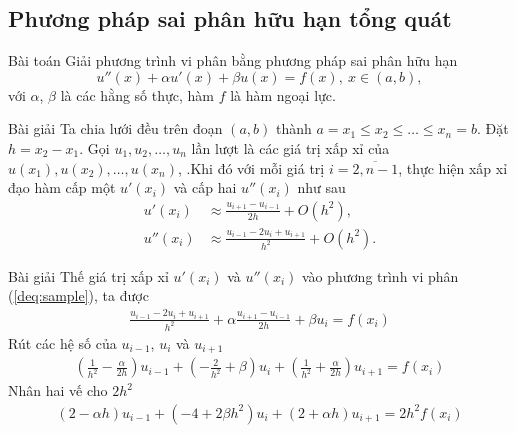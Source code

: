 \documentclass[9pt]{beamer}
\numberwithin{equation}{section}
\begin{document}
\subsection{Phương pháp sai phân hữu hạn tổng quát}

\begin{frame}
\begin{block}{Bài toán}
    Giải phương trình vi phân bằng phương pháp sai phân hữu hạn
    \begin{equation}
        u''(x) + \alpha u'(x) + \beta u(x) = f(x), \ x \in (a,b), \label{deq:sample}
    \end{equation}
    với $\alpha$, $\beta$ là các hằng số thực, hàm $f$ là hàm ngoại lực.
\end{block}
    
\begin{exampleblock}{Bài giải}
    Ta chia lưới đều trên đoạn $(a,b)$ thành $a = x_1 \le x_2 \le \ldots \le x_n = b$. Đặt $h = x_2 - x_1 $. Gọi $u_1, u_2, \ldots, u_n$ lần lượt là các giá trị xấp xỉ của $u(x_1), u(x_2), \ldots, u(x_n)$, .Khi đó với mỗi giá trị $i = \overline{2, n-1}$, thực hiện xấp xỉ đạo hàm cấp một $u'(x_i)$ và cấp hai $u''(x_i)$ như sau
    \begin{align*}
        u'(x_i) &\approx \frac{u_{i+1} - u_{i-1}}{2h} + O(h^2), \\
        u''(x_i) &\approx \frac{u_{i-1} - 2u_i + u_{i+1}}{h^2} + O(h^2).
    \end{align*}
\end{exampleblock}
\end{frame}

\begin{frame}
\begin{exampleblock}{Bài giải}
    Thế giá trị xấp xỉ $u'(x_i)$ và $u''(x_i)$ vào phương trình vi phân (\ref{deq:sample}), ta được
    \begin{align*}
        \frac{u_{i-1} - 2u_i + u_{i+1}}{h^2} + \alpha \frac{u_{i+1} - u_{i-1}}{2h} + \beta u_i = f(x_i)
    \end{align*}
    Rút các hệ số của $u_{i-1}$, $u_i$ và $u_{i+1}$
    \begin{align*}
        \left(\frac{1}{h^2} - \frac{\alpha}{2h}\right) u_{i-1} + \left(-\frac{2}{h^2}+\beta\right) u_i + \left(\frac{1}{h^2} + \frac{\alpha}{2h}\right) u_{i+1} = f(x_i)
    \end{align*}
    Nhân hai vế cho $2h^2$
    \begin{align}
        (2 - \alpha h) u_{i-1} + (-4 + 2\beta h^2) u_i + (2 + \alpha h) u_{i+1} = 2h^2 f(x_i) \label{deq:solution}
    \end{align}
\end{exampleblock}
\end{frame}
\end{document}
